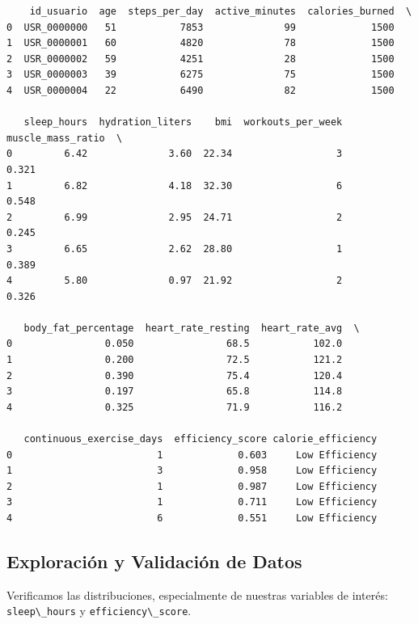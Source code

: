 \begin{lstlisting}
    id_usuario  age  steps_per_day  active_minutes  calories_burned  \
0  USR_0000000   51           7853              99             1500   
1  USR_0000001   60           4820              78             1500   
2  USR_0000002   59           4251              28             1500   
3  USR_0000003   39           6275              75             1500   
4  USR_0000004   22           6490              82             1500   

   sleep_hours  hydration_liters    bmi  workouts_per_week  muscle_mass_ratio  \
0         6.42              3.60  22.34                  3              0.321   
1         6.82              4.18  32.30                  6              0.548   
2         6.99              2.95  24.71                  2              0.245   
3         6.65              2.62  28.80                  1              0.389   
4         5.80              0.97  21.92                  2              0.326   

   body_fat_percentage  heart_rate_resting  heart_rate_avg  \
0                0.050                68.5           102.0   
1                0.200                72.5           121.2   
2                0.390                75.4           120.4   
3                0.197                65.8           114.8   
4                0.325                71.9           116.2   

   continuous_exercise_days  efficiency_score calorie_efficiency  
0                         1             0.603     Low Efficiency  
1                         3             0.958     Low Efficiency  
2                         1             0.987     Low Efficiency  
3                         1             0.711     Low Efficiency  
4                         6             0.551     Low Efficiency  
\end{lstlisting}

\phantomsection\label{7164ed47}
\subsection{Exploración y Validación de
   Datos}\label{exploraciuxf3n-y-validaciuxf3n-de-datos}

Verificamos las distribuciones, especialmente de nuestras variables de
interés: \passthrough{\lstinline!sleep\_hours!} y
\passthrough{\lstinline!efficiency\_score!}.

